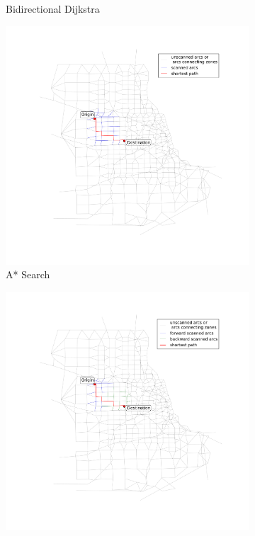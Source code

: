 \begin{figure}
\begin{subfigure}{.5\textwidth}
        \caption{Bidirectional Dijkstra}
        \label{fig:chicago_bidirect2}
    \end{subfigure}
    \begin{subfigure}{.5\textwidth}
        \centering
        \includegraphics[width=\textwidth,trim=120px 120px 48px 0px,clip]{img/chicago_astar2}
        \caption{A* Search}
        \label{fig:chicago_astar2}
    \end{subfigure}%
    \begin{subfigure}{.5\textwidth}
        \centering
        \includegraphics[width=\textwidth,trim=120px 120px 48px 0px,clip]{img/chicago_astar_bidirect2}

\end{subfigure}
\end{figure}
